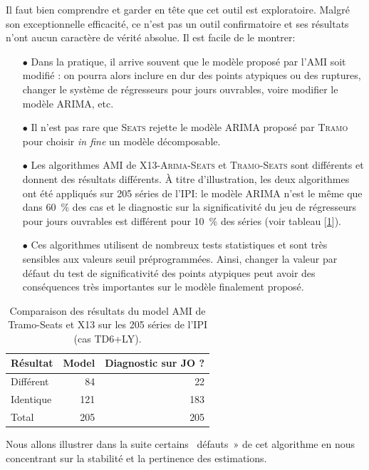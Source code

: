 \documentclass[12pt, a4paper, french]{article}
\begin{document}
Il faut bien comprendre et garder en tête que cet outil est exploratoire. Malgré son exceptionnelle efficacité, ce n'est pas un outil confirmatoire et ses résultats n'ont aucun caractère de vérité absolue. Il est facile de le montrer:
\begin{itemize}
	\item[$\bullet$] Dans la pratique, il arrive souvent que le modèle proposé par l'AMI soit modifié : on pourra alors inclure en dur des points atypiques ou des ruptures, changer le système de régresseurs pour jours ouvrables, voire modifier le modèle ARIMA, etc.
	\item[$\bullet$] Il n'est pas rare que \textsc{Seats} rejette le modèle ARIMA proposé par \textsc{Tramo} pour choisir \emph{in fine} un modèle décomposable.
	\item[$\bullet$] Les algorithmes AMI de \textsc{X13-Arima-Seats} et \textsc{Tramo-Seats} sont différents et donnent des résultats différents. À titre d'illustration, les deux algorithmes ont été appliqués sur 205 séries de l'IPI: le modèle ARIMA n'est le même que dans 60~\% des cas et le diagnostic sur la significativité du jeu de régresseurs pour jours ouvrables est différent pour 10~\% des séries (voir tableau [\ref{table:CompareTSX13}]).
	\item[$\bullet$] Ces algorithmes utilisent de nombreux tests statistiques et sont très sensibles aux valeurs seuil préprogrammées. Ainsi, changer la valeur par défaut du test de significativité des points atypiques peut avoir des conséquences très importantes sur le modèle finalement proposé.
\end{itemize}

\begin{table}
\caption{\label{table:CompareTSX13}Comparaison des résultats du model AMI de Tramo-Seats et X13 sur les 205 séries de l'IPI (cas TD6+LY).}
\begin{center}
\small
\begin{tabular}{lrr} \\
\hline
\rule{0pt}{3ex}Résultat&Model&Diagnostic sur JO ?  \\
\hline
Différent&  84&  22 \\
Identique& 121& 183 \\
\hline
Total& 205 & 205  \\
\hline
\end{tabular}
\normalsize
\end{center}
\end{table}

Nous allons illustrer dans la suite certains \og~défauts~» de cet algorithme en nous concentrant sur la stabilité et la pertinence des estimations.
\end{document}
